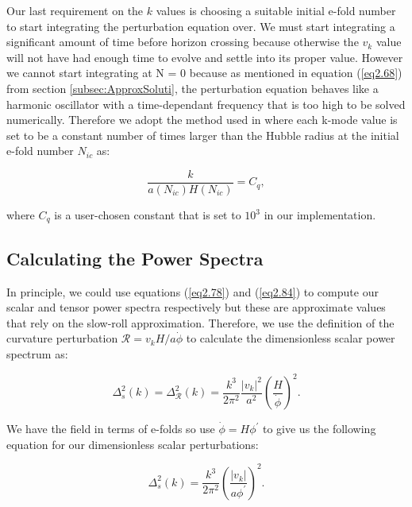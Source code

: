 \documentclass[a4paper,12pt,twoside]{report}
\newcommand{\abs}[1]{\lvert#1\rvert}
\begin{document}
Our last requirement on the $k$ values is choosing a suitable initial e-fold number to start integrating the perturbation equation over. We must start integrating a significant amount of time before horizon crossing because otherwise the $v_{k}$ value will not have had enough time to evolve and settle into its proper value. However we cannot start integrating at N = 0 because as mentioned in equation (\ref{eq2.68}) from section \ref{subsec:ApproxSoluti}, the perturbation equation behaves like a harmonic oscillator with a time-dependant frequency that is too high to be solved numerically. Therefore we adopt the method used in \cite{Ringeval:2007am, Salopek:1988qh} where each k-mode value is set to be a constant number of times larger than the Hubble radius at the initial e-fold number $N_{ic}$ as:

\begin{equation} \label{eq3.32}
\frac{k}{a(N_{ic})H(N_{ic})} = C_{q},
\end{equation}

where $C_{q}$ is a user-chosen constant that is set to $10^{3}$ in our implementation.

\subsection{Calculating the Power Spectra} \label{subsec:CalcPowSpec}

In principle, we could use equations (\ref{eq2.78}) and (\ref{eq2.84}) to compute our scalar and tensor power spectra respectively but these are approximate values that rely on the slow-roll approximation. Therefore, we use the definition of the curvature perturbation $\mathcal{R} = v_{k}H/a\dot{\phi}$ to calculate the dimensionless scalar power spectrum as:

\begin{equation} \label{eq3.33}
\Delta^{2}_{s}(k) = \Delta^{2}_{\mathcal{R}}(k) = \frac{k^{3}}{2\pi^{2}} \frac{\abs{v_{k}}^{2}}{a^{2}} \left( \frac{H}{\dot{\phi}} \right)^{2}.
\end{equation}

We have the field in terms of e-folds so use $\dot{\phi} = H\phi^{\prime}$ to give us the following equation for our dimensionless scalar perturbations:

\begin{equation} \label{eq3.34}
\Delta^{2}_{s}(k) = \frac{k^{3}}{2\pi^{2}} \left( \frac{\abs{v_{k}}}{a \phi^{\prime}} \right)^{2}.
\end{equation}
\end{document}
